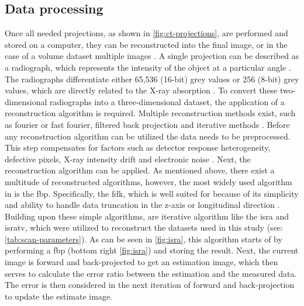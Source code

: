 \subsection{Data processing}\label{s:b-mct-processing}
Once all needed projections, as shown in \cref{fig:ct-projections}, are performed and stored on a computer, they can be reconstructed into the final image, or in the case of a volume dataset multiple images \cite{liMicrocomputedTomographySmall2008,orhanMicrocomputedTomographyMicroCT2020}.
A single projection can be described as a radiograph, which represents the intensity of the object at a particular angle \cite{liMicrocomputedTomographySmall2008,orhanMicrocomputedTomographyMicroCT2020}.
The radiographs differentiate either 65,536 (16-\gls{bit}) grey values or 256 (8-\gls{bit}) grey values, which are directly related to the X-ray absorption \cite{liMicrocomputedTomographySmall2008,orhanMicrocomputedTomographyMicroCT2020}.
To convert these two-dimensional radiographs into a three-dimensional dataset, the application of a reconstruction algorithm is required.
Multiple reconstruction methods exist, such as fourier or fast fourier, filtered back projection and iterative methods \cite{liMicrocomputedTomographySmall2008,orhanMicrocomputedTomographyMicroCT2020}.
Before any reconstruction algorithm can be utilized the data needs to be preprocessed.
This step compensates for factors such as detector response heterogeneity, defective pixels, X-ray intensity drift and electronic noise \cite{liMicrocomputedTomographySmall2008}.
Next, the reconstruction algorithm can be applied.
As mentioned above, there exist a multitude of reconstructed algorithms, however,
the most widely used algorithm in \mct\space is the \acrfull{fbp}.
Specifically, the \acrfull{fdk}, which is well suited for \mct\space because of its simplicity
and ability to handle data truncation in the z-axis or longitudinal direction \cite{liMicrocomputedTomographySmall2008,orhanMicrocomputedTomographyMicroCT2020}.
Building upon these simple algorithms, are iterative algorithm like the \gls{isra} and \gls{isratv},
which were utilized to reconstruct the datasets used in this study (see: \cref{tab:scan-parameters}).
As can be seen in \cref{fig:isra}, this algorithm starts of by performing a \acrshort{fbp} (bottom right \cref{fig:isra}) and storing the result.
Next, the current image is forward and back-projected  to get an estimation image,
which then serves to calculate the error ratio between the estimation and the measured data.
The error is then considered in the next iteration of forward and back-projection to update the estimate image.
